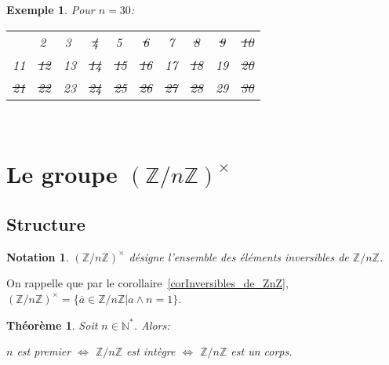 \documentclass[12pt]{report}
\newtheorem{thm}{Théorème}[chapter]
\newtheorem*{ex}{Exemple}
\newtheorem*{nota}{Notation}
\newcommand{\Z}{\mathbb{Z}}
\begin{document}
\begin{ex}
Pour $n=30$: \\
\begin{tabular}{cccccccccc}
  & \textcircled{2} & \textcircled{3} & \sout{4} & \textcircled{5} & \sout{6} & 7& \sout{8} & \sout{9} & \sout{10}  \\
   11 & \sout{12} & 13 & \sout{14} & \sout{15} & \sout{16} & 17 &\sout{18} & 19 & \sout{20}\\
   \sout{21} & \sout{22} & 23 & \sout{24} & \sout{25} & \sout{26} & \sout{27} & \sout{28} & 29 & \sout{30}
\end{tabular}\\

\end{ex}


\section{Le groupe $(\mathbb{Z}/n\mathbb{Z})^{\times}$}

\subsection{Structure}



\begin{nota}
$(\mathbb{Z}/n\mathbb{Z})^{\times}$ désigne l'ensemble des éléments inversibles de $\mathbb{Z}/n\mathbb{Z}$.
\end{nota}

On rappelle que par le corollaire~\ref{corInversibles_de_ZnZ}, $(\Z/n\Z)^{\times}=\{\overline{a}\in \Z/n\Z|a\wedge n=1\}$.

\begin{thm}
Soit $n \in \mathbb{N}^*$. Alors:\par 
$n$ est premier $\Longleftrightarrow$ $\mathbb{Z} / n \mathbb{Z}$ est intègre $\Longleftrightarrow$ $\mathbb{Z}/n\mathbb{Z}$ est un corps.
\end{thm}
\end{document}
